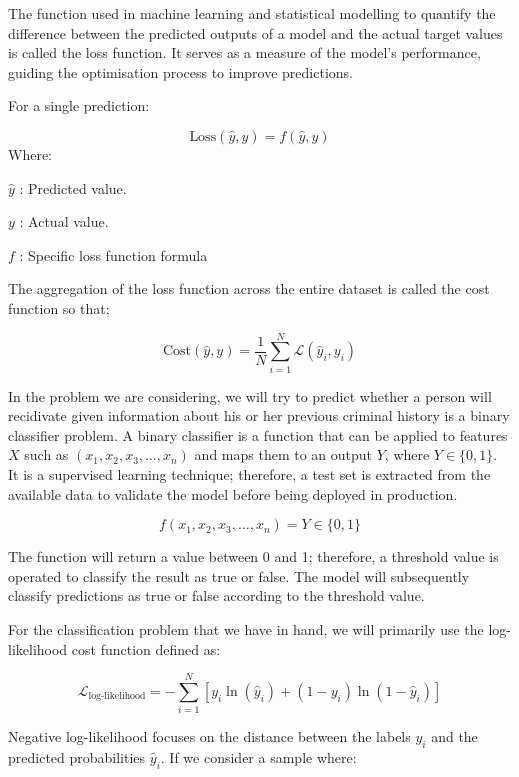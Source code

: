 \documentclass[conference]{IEEEtran}
\begin{document}
	The function used in machine learning and statistical modelling to quantify the difference between the predicted outputs of a model and the actual target values is called the loss function. It serves as a measure of the model's performance, guiding the optimisation process to improve predictions.
	
	For a single prediction:
	
	$$\text{Loss}(\hat{y}, y) = f(\hat{y}, y)$$
	Where:
	
	
	\begin{compactitem}
		\item [$\hat{y}$]: Predicted value.
		\item [$y$]: Actual value.
		\item [$f$]: Specific loss function formula
	\end{compactitem}
	
	\bigskip
	
	The aggregation of the loss function across the entire dataset is called the cost function so that;
	
	$$
	\text{Cost}(\hat{y}, y) = \frac{1}{N}\sum_{i=1}^{N} \mathcal{L}(\widehat{y}_i, y_i)
	$$
	
	In the problem we are considering, we will try to predict whether a person will recidivate given information about his or her previous criminal history is a binary classifier problem. A binary classifier is a function that can be applied to features $X$ such as $(x_1, x_2, x_3, \dots, x_n)$ and maps them to an output $Y$, where $Y \in \{0, 1\}$. It is a supervised learning technique; therefore, a test set is extracted from the available data to validate the model before being deployed in production.
	
	$$ f(x_1, x_2, x_3, \dots, x_n) = Y \in \{0, 1\}  $$
	
	The function will return a value between 0 and 1; therefore, a threshold value is operated to classify the result as true or false. The model will subsequently classify predictions as true or false according to the threshold value.
	
	
	For the classification problem that we have in hand, we will  primarily use the log-likelihood  cost function defined as:
	
	$$\mathcal{L}_{\text{log-likelihood}} = - \sum_{i=1}^N \left[ y_i \ln(\hat{y}_i) + (1 - y_i) \ln(1 - \hat{y}_i) \right]$$
	
	Negative log-likelihood focuses on the distance between the labels $y_i$ and the predicted probabilities $\hat{y}_i$. If we consider a sample where:
	
\end{document}
